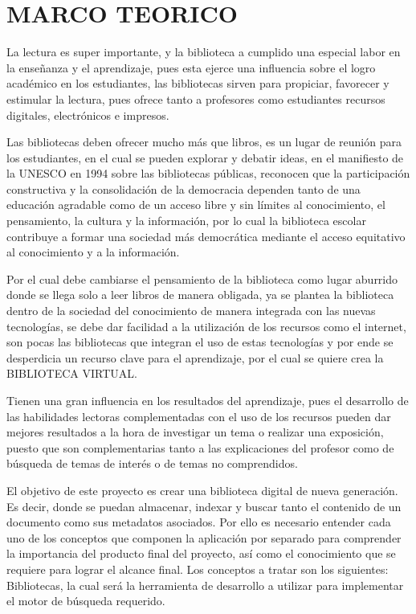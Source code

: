 \section{MARCO TEORICO} 

\begin{enumerate}[1.]
	
	La lectura es super importante, y la biblioteca a cumplido una especial labor en la enseñanza y el aprendizaje, pues esta ejerce una influencia sobre el logro académico en los estudiantes, las bibliotecas sirven para propiciar, favorecer y estimular la lectura, pues ofrece tanto a profesores como estudiantes recursos digitales, electrónicos e impresos. 
	
	Las bibliotecas deben ofrecer mucho más que libros, es un lugar de reunión para los estudiantes, en el cual se pueden explorar y debatir ideas, en el manifiesto de la UNESCO en 1994 sobre las bibliotecas públicas, reconocen que la participación constructiva y la consolidación de la democracia dependen tanto de una educación agradable como de un acceso libre y sin límites al conocimiento, el pensamiento, la cultura y la información, por lo cual la biblioteca escolar contribuye a formar una sociedad más democrática mediante el acceso equitativo al conocimiento y a la información.
	
	Por el cual debe cambiarse el pensamiento de la biblioteca como lugar aburrido donde se llega solo a leer libros de manera obligada, ya se plantea la biblioteca dentro de la sociedad del conocimiento de manera integrada con las nuevas tecnologías, se debe dar facilidad a la utilización de los recursos como el internet, son pocas las bibliotecas que integran el uso de estas tecnologías y por ende se desperdicia un recurso clave para el aprendizaje, por el cual se quiere crea la BIBLIOTECA VIRTUAL.
	
	Tienen una gran influencia en los resultados del aprendizaje, pues el desarrollo de las habilidades lectoras complementadas con el uso de los recursos pueden dar mejores resultados a la hora de investigar un tema o realizar una exposición, puesto que son complementarias tanto a las explicaciones del profesor como de búsqueda de temas de interés o de temas no comprendidos. 
	
El objetivo de este proyecto es crear una biblioteca digital de nueva generación.
Es decir, donde se puedan almacenar, indexar y buscar tanto el contenido de un documento como sus metadatos asociados.
Por ello es necesario entender cada uno de los conceptos que componen la aplicación por separado para comprender la importancia 	del producto final del 	proyecto, así como el conocimiento que se requiere para lograr el alcance final.
Los conceptos a tratar son los siguientes: Bibliotecas, la cual será la	herramienta de desarrollo a utilizar para implementar el 	motor de búsqueda requerido. 

\end{enumerate} 

